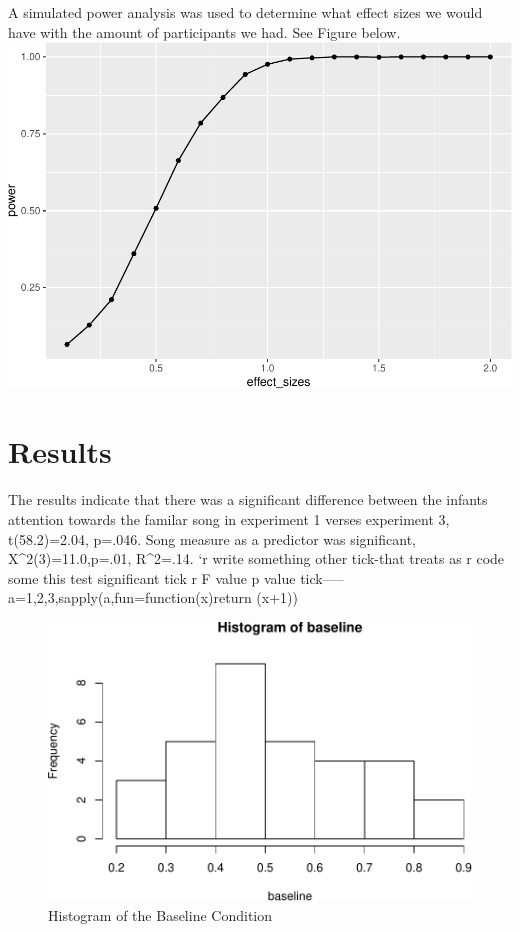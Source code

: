 \documentclass[man]{apa6}
\begin{document}
A simulated power analysis was used to determine what effect sizes we
would have with the amount of participants we had. See Figure below.
\includegraphics{Papa_files/figure-latex/unnamed-chunk-3-1.pdf}

\section{Results}\label{results}

The results indicate that there was a significant difference between the
infants attention towards the familar song in experiment 1 verses
experiment 3, t(58.2)=2.04, p=.046. Song measure as a predictor was
significant, X\^{}2(3)=11.0,p=.01, R\^{}2=.14. `r write something other
tick-that treats as r code some this test significant tick r F value p
value tick-----a=1,2,3,sapply(a,fun=function(x)return (x+1))

\begin{figure}
\centering
\includegraphics{Papa_files/figure-latex/myfig-1.pdf}
\caption{\label{fig:myfig}Histogram of the Baseline Condition}
\end{figure}
\end{document}
